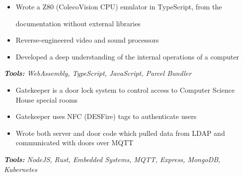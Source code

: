 \documentclass[10pt,letter]{altacv}
\begin{document}

\begin{fullwidth}
\marginpar{\makesidebarheader}
    \vspace*{-1\baselineskip}
\makecvheader
\end{fullwidth}

\vspace{14pt}


\begin{itemize}
\item Wrote a Z80 (ColecoVision CPU) emulator in TypeScript, from the

  documentation without external libraries
\item Reverse-engineered video and sound processors
\item Developed a deep understanding of the internal operations of a computer
\end{itemize}
\textit{\textbf{Tools:} WebAssembly, TypeScript, JavaScript, Parcel Bundler}

\divider
  
\begin{itemize}
\item Gatekeeper is a door lock system to control access to Computer Science House special rooms
\item Gatekeeper uses NFC (DESFire) tags to authenticate users
\item Wrote both server and door code which pulled data from LDAP and communicated with doors over MQTT
\end{itemize}
\textit{\textbf{Tools:} NodeJS, Rust, Embedded Systems, MQTT, Express, MongoDB, Kubernetes}
\end{document}
